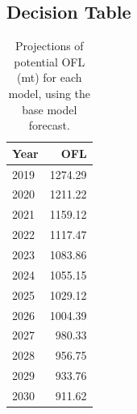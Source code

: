 \documentclass[12pt,]{article}
\begin{document}
\FloatBarrier

\hypertarget{decision-table}{%
\subsection*{Decision Table}\label{decision-table}}

\begin{table}[ht]
\centering
\caption{Projections of potential OFL (mt) for 
                                        each model, using the base model forecast.} 
\label{tab:OFL_projection}
\begin{tabular}{lr}
  \hline
Year & OFL \\ 
  \hline
2019 & 1274.29 \\ 
  2020 & 1211.22 \\ 
  2021 & 1159.12 \\ 
  2022 & 1117.47 \\ 
  2023 & 1083.86 \\ 
  2024 & 1055.15 \\ 
  2025 & 1029.12 \\ 
  2026 & 1004.39 \\ 
  2027 & 980.33 \\ 
  2028 & 956.75 \\ 
  2029 & 933.76 \\ 
  2030 & 911.62 \\ 
   \hline
\end{tabular}
\end{table}
\end{document}
